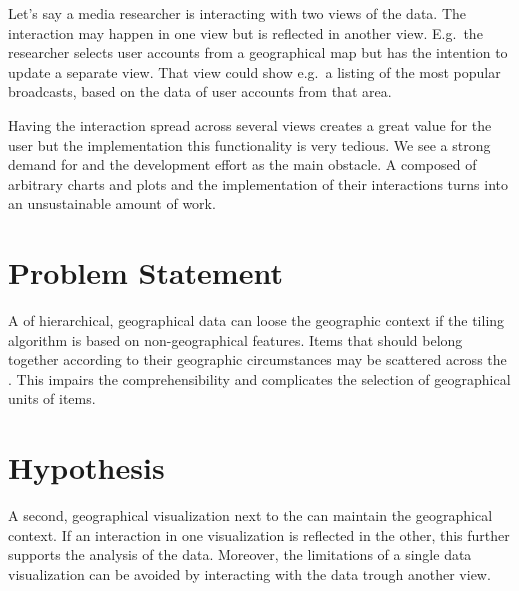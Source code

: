 Let's say a media researcher is interacting with two views of the data.
The interaction may happen in one view but is reflected in another view.
E.g.\ the researcher selects user accounts from a geographical map but has the intention to update a separate view.
That view could show e.g.\ a listing of the most popular broadcasts, based on the data of user accounts from that area.

Having the interaction spread across several views creates a great value for the user but the implementation this functionality is very tedious.
We see a strong demand for \cmvs{} and the development effort as the main obstacle.
A \cmv{} composed of arbitrary charts and plots and the implementation of their interactions turns into an unsustainable amount of work.

\section{Problem Statement}
%

A \tmap{} of hierarchical, geographical data can loose the geographic context if the tiling algorithm is based on non-geographical features.
Items that should belong together according to their geographic circumstances may be scattered across the \tmap{}.
This impairs the comprehensibility and complicates the selection of geographical units of items.

\section{Hypothesis}

A second, geographical visualization next to the \tmap{} can maintain the geographical context.
If an interaction in one visualization is reflected in the other, this further supports the analysis of the data.
Moreover, the limitations of a single data visualization can be avoided by interacting with the data trough another view.


